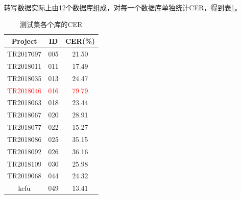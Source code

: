 转写数据实际上由12个数据库组成，对每一个数据库单独统计CER，得到表\ref{tab:cer-per}。
\begin{table}[h]
 \centering
 \caption{测试集各个库的CER}
	 \begin{tabular*}{1\textwidth}{@{\extracolsep{\fill}}ccc}
	 \toprule
		{\bf Project   } & {\bf ID   } & {\bf CER(\%)  } \\
	 \midrule
		TR2017097  &         005 &        21.50 \\
		TR2018011  &         011 &        17.49 \\
		TR2018035  &         013 &        24.47 \\
		\textcolor{red}{TR2018046}  &         \textcolor{red}{016} &         \textcolor{red}{79.79} \\
		TR2018063  &         018 &        23.44 \\
		TR2018067  &         020 &        28.91 \\
		TR2018077  &         022 &        15.27 \\
		TR2018086  &         025 &        35.15 \\
		TR2018092  &         026 &        36.16 \\
		TR2018109  &         030 &        25.98 \\
		TR2019068  &         044 &        24.32 \\
		kefu       &         049 &        13.41 \\
	 \bottomrule
	 \end{tabular*}%
 \label{tab:cer-per}%
\end{table}%
